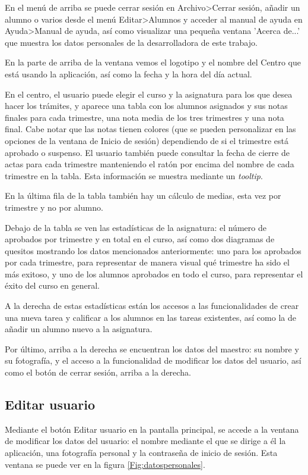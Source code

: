 En el menú de arriba se puede cerrar sesión en Archivo>Cerrar sesión, añadir un alumno o varios desde el menú Editar>Alumnos y acceder al manual de ayuda en Ayuda>Manual de ayuda, así como visualizar una pequeña ventana 'Acerca de...' que muestra los datos personales de la desarrolladora de este trabajo.

En la parte de arriba de la ventana vemos el logotipo y el nombre del Centro que está usando la aplicación, así como la fecha y la hora del día actual. 

En el centro, el usuario puede elegir el curso y la asignatura para los que desea hacer los trámites, y aparece una tabla con los alumnos asignados y sus notas finales para cada trimestre, una nota media de los tres trimestres y una nota final. Cabe notar que las notas tienen colores (que se pueden personalizar en las opciones de la ventana de Inicio de sesión) dependiendo de si el trimestre está aprobado o suspenso. El usuario también puede consultar la fecha de cierre de actas para cada trimestre manteniendo el ratón por encima del nombre de cada trimestre en la tabla. Esta información se muestra mediante un \textit{tooltip}.

En la última fila de la tabla también hay un cálculo de medias, esta vez por trimestre y no por alumno.

Debajo de la tabla se ven las estadísticas de la asignatura: el número de aprobados por trimestre y en total en el curso, así como dos diagramas de quesitos mostrando los datos mencionados anteriormente: uno para los aprobados por cada trimestre, para representar de manera visual qué trimestre ha sido el más exitoso, y uno de los alumnos aprobados en todo el curso, para representar el éxito del curso en general.

A la derecha de estas estadísticas están los accesos a las funcionalidades de crear una nueva tarea y calificar a los alumnos en las tareas existentes, así como la de añadir un alumno nuevo a la asignatura.

Por último, arriba a la derecha se encuentran los datos del maestro: su nombre y su fotografía, y el acceso a la funcionalidad de modificar los datos del usuario, así como el botón de cerrar sesión, arriba a la derecha.


\subsection{Editar usuario}
Mediante el botón Editar usuario en la pantalla principal, se accede a la ventana de modificar los datos del usuario: el nombre mediante el que se dirige a él la aplicación, una fotografía personal y la contraseña de inicio de sesión. Esta ventana se puede ver en la figura \ref{Fig:datospersonales}.

